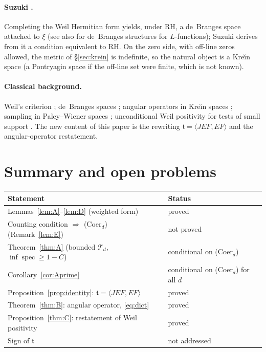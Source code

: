 \documentclass[11pt]{amsart}
\theoremstyle{definition}
\theoremstyle{remark}
\newcommand{\spec}{\operatorname{spec}}
\newcommand{\tform}{\mathfrak t}
\newcommand{\Top}{\mathcal T}
\begin{document}
\paragraph{Suzuki \cite{Suzuki}.} Completing the Weil Hermitian form yields, under RH, a
de~Branges space attached to $\xi$ (see also \cite{Lagarias} for de~Branges structures for
$L$-functions); Suzuki derives from it a condition equivalent to RH. On the zero side,
with off-line zeros allowed, the metric of \S\ref{sec:krein} is indefinite, so the natural
object is a Kre\u{\i}n space (a Pontryagin space if the off-line set were finite, which is
not known).

\paragraph{Classical background.} Weil's criterion \cite{Weil1952,Bombieri2000};
de~Branges spaces \cite{deBranges}; angular operators in Kre\u{\i}n spaces
\cite{AzizovIokhvidov}; sampling in Paley--Wiener spaces \cite{PlancherelPolya,Beurling,Seip};
unconditional Weil positivity for tests of small support \cite{Yoshida}. The new content of
this paper is the rewriting $\tform=\langle JEF,EF\rangle$ and the angular-operator
restatement.

\section{Summary and open problems}\label{sec:open}

\begin{center}
\small
\begin{tabular}{ll}
\toprule
Statement & Status \\
\midrule
Lemmas~\ref{lem:A}--\ref{lem:D} (weighted form) & proved \\
Counting condition $\Rightarrow$ (Coer$_d$) (Remark~\ref{lem:E}) & not proved \\
Theorem~\ref{thm:A} (bounded $\Top_d$, $\inf\spec\ge1-C$) & conditional on (Coer$_d$) \\
Corollary~\ref{cor:Aprime} & conditional on (Coer$_d$) for all $d$ \\
Proposition~\ref{prop:identity}: $\tform=\langle JEF,EF\rangle$ & proved \\
Theorem~\ref{thm:B}: angular operator, \eqref{eq:dict} & proved \\
Proposition~\ref{thm:C}: restatement of Weil positivity & proved \\
Sign of $\tform$ & not addressed \\
\bottomrule
\end{tabular}
\end{center}
\end{document}
